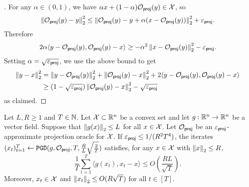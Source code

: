 \begin{proof}[]
For any $\alpha \in (0,1)$, we have $\alpha x + (1-\alpha)\Oproj(y) \in \MX$, so
\[\norm{\Oproj(y) - y}_2^2 \leq \norm{\Oproj(y) - y + \alpha ( x - \Oproj(y))}_2^2 + \epproj.\]
Therefore
\[2\alpha \langle y - \Oproj(y), \Oproj(y) - x\rangle \geq -\alpha^2 \norm{x - \Oproj(y)}_2^2 - \epproj.\]
Setting $\alpha = \sqrt{\epproj}$, we use the above bound to get
\begin{align}
\norm{y-x}_2^2
&= \norm{y-\Oproj(y)}_2^2 + \norm{\Oproj(y)-x}_2^2 + 2\langle y-\Oproj(y), \Oproj(y)-x\rangle \\ 
&\geq (1-\sqrt{\epproj})\norm{\Oproj(y)-x}_2^2 - \sqrt{\epproj}
\end{align}
as claimed.
\end{proof}

\begin{lemma}\label{lemma:pgd}
Let $L,R \geq 1$ and $T \in \NN$. Let $\MX \subset \RR^n$ be a convex set and let $g: \RR^n \to \RR^n$ be a vector field. Suppose that $\norm{g(x)}_2 \leq L$ for all $x \in \MX$. Let $\Oproj$ be an $\epproj$-approximate projection oracle for $\MX$. If $\epproj \leq 1/(R^2 T^4)$, the iterates $(x_t)_{t=1}^T \gets \PGD(g,\Oproj,T, \frac{R}{L}\sqrt{\frac{2}{T}})$ satisfies, for any $x \in \MX$ with $\norm{x}_2 \leq R$,
\[\frac{1}{T}\sum_{t=1}^T \langle g(x_t), x_t - x\rangle \leq O\left(\frac{RL}{\sqrt{T}}\right).\]
Moreover, $x_t \in \MX$ and $\norm{x_t}_2 \leq O(R\sqrt{T})$ for all $t \in [T]$.
\end{lemma}

